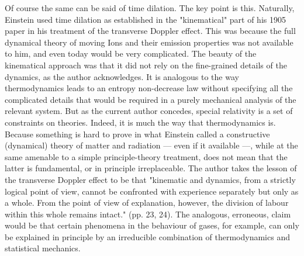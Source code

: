 \documentclass[submitted,11pt]{article}
\begin{document}
\begin{point}
Of course the same can be said of time dilation. The key point is this. Naturally, Einstein used time dilation as established in the "kinematical" part of his 1905 paper in his treatment of the transverse Doppler effect. This was because the full dynamical theory of moving Ions and their emission properties was not available to him, and even today would be very complicated. The beauty of the kinematical approach was that it did not rely on the fine-grained details of the dynamics, as the author acknowledges. It is analogous to the way thermodynamics leads to an entropy non-decrease law without specifying all the complicated details that would be required in a purely mechanical analysis of the relevant system. But as the current author concedes, special relativity is a set of constraints on theories. Indeed, it is much the way that thermodynamics is. Because something is hard to prove in what Einstein called a constructive (dynamical) theory of matter and radiation — even if
it available —, while at the same amenable to a simple principle-theory treatment, does not mean that the latter is fundamental, or in principle irreplaceable. The author takes the lesson of the transverse Doppler effect to be that "kinematic and dynamics, from a strictly logical point of view, cannot be confronted with experience separately but only as a whole. From the point of view of explanation, however, the division of labour within this whole remains intact." (pp. 23, 24).  The analogous, erroneous, claim would be that certain phenomena in the behaviour of gases, for example, can only be explained in principle by an irreducible combination of thermodynamics and statistical mechanics.
\end{point}
\end{document}
